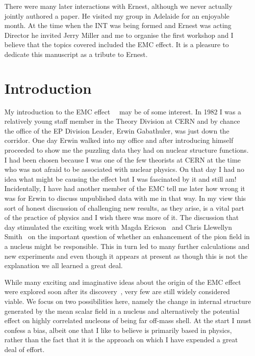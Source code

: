 \documentclass{ws-ijmpe}
\begin{document}
There were many later interactions with Ernest, although we never actually jointly authored a paper. He 
visited my group in Adelaide for an enjoyable month. At the time when the INT was being formed and 
Ernest was acting Director he invited Jerry Miller and me to organise the first workshop and I believe that 
the topics covered included the EMC effect. It is a pleasure to dedicate this manuscript as a tribute to Ernest.

\section{Introduction}

My introduction to the EMC effect~~\cite{Aubert:1983xm,Bodek:1983ec,Geesaman:1995yd,Malace:2014uea} 
may be of some interest. 
In 1982 I was a relatively young staff member in the 
Theory Division at CERN and by chance the office of the EP Division Leader, Erwin Gabathuler, was just 
down the corridor. One day Erwin walked into my office and after introducing himself proceeded to show me 
the puzzling data they had on nuclear structure functions. I had been chosen because I was one of the few 
theorists at CERN at the time who was not afraid to be associated with nuclear physics. On that day I had no 
idea what might be causing the effect but I was fascinated by it and still am! Incidentally, I have had another 
member of the EMC tell me later how wrong it was for Erwin to discuss unpublished data with me in that way. 
In my view this sort of honest discussion of challenging new results, 
as they arise, is a vital part of the practice
of physics and I wish there was more of it. The discussion that day stimulated the exciting work with Magda 
Ericson~\cite{Ericson:1983um} and Chris Llewellyn Smith~\cite{LlewellynSmith:1983vzz} on 
the important question of whether an enhancement of the pion field in a nucleus might 
be responsible. This in turn led to many further calculations and new experiments and even though it appears 
at present as though this is not the explanation we all learned a great deal.

While many exciting and imaginative ideas about the origin of the EMC effect were explored soon after its 
discovery~\cite{Nachtmann:1983py,Close:1983tn,Kondratyuk:1984qj,Celenza:1984ew,Bickerstaff:1985mp,Frankfurt:1985cv,Krzywicki:1985fd,Saito:1985ct,Gupta:1985mg,Dunne:1985ks,Hoodbhoy:1986fn,Efremov:1986mt,Bickerstaff:1989ch}, 
very few are still widely considered viable. We focus on two possibilities here, namely the change in internal structure generated by the mean scalar field in a nucleus and alternatively the potential effect on highly correlated nucleons of being far off-mass shell. At the start I must confess a bias, albeit one that I like to believe is primarily based in physics, rather than the fact that it is the approach on which I have expended a great deal of effort. 
\end{document}
